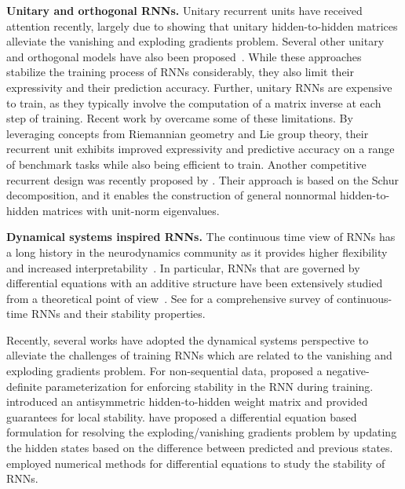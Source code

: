 \documentclass{article} \usepackage{iclr2021_conference,times}
\begin{document}
\textbf{Unitary and orthogonal RNNs.}
Unitary recurrent units have received attention recently, largely due to \citet{arjovsky2016unitary} showing that unitary hidden-to-hidden matrices alleviate the vanishing and exploding gradients problem. Several other unitary and orthogonal models have also been proposed~\citep{wisdom2016full,mhammedi2017efficient,jing2017tunable,vorontsov2017orthogonality,jose2018kronecker}. While these approaches stabilize the training process of RNNs considerably, they also limit their expressivity and their prediction accuracy. Further, unitary RNNs are expensive to train, as they typically involve the computation of a matrix inverse at each step of training. Recent work by \citet{lezcano2019cheap} overcame some of these limitations. By leveraging concepts from Riemannian geometry and Lie group theory, their recurrent unit exhibits improved expressivity and predictive accuracy on a range of benchmark tasks while also being efficient to train. Another competitive recurrent design was recently proposed by \citet{kerg2019non}. Their approach is based on the Schur decomposition, and it enables the construction of general nonnormal hidden-to-hidden matrices with unit-norm eigenvalues.

\textbf{Dynamical systems inspired RNNs.}
The continuous time view of RNNs has a long history in the neurodynamics community as it provides higher flexibility and increased interpretability~\citep{pineda1988dynamics,pearlmutter1995gradient,zhang2014comprehensive}.
In particular, RNNs that are governed by differential equations with an additive structure have been extensively studied from a theoretical point of view~\citep{funahashi1993approximation,kim1996nonlinear,chow2000modeling,hu2002global,li2005approximation,trischler2016synthesis}. See \cite{zhang2014comprehensive} for a comprehensive survey of continuous-time RNNs and their stability properties.

Recently, several works have adopted the dynamical systems perspective to alleviate the challenges of training RNNs which are related to the vanishing and exploding gradients problem. For non-sequential data, \cite{NEURIPS2018_7bd28f15} proposed a negative-definite parameterization for enforcing stability in the RNN during training. \cite{chang2018antisymmetricrnn} introduced an antisymmetric hidden-to-hidden weight matrix and provided guarantees for local stability.
\citet{Kag2020RNNs} have proposed a differential equation based formulation for resolving the exploding/vanishing gradients problem by updating the hidden states based on the difference between predicted and previous states.
\citet{niu2019recurrent} employed numerical methods for differential equations to study the stability of RNNs.
\end{document}
